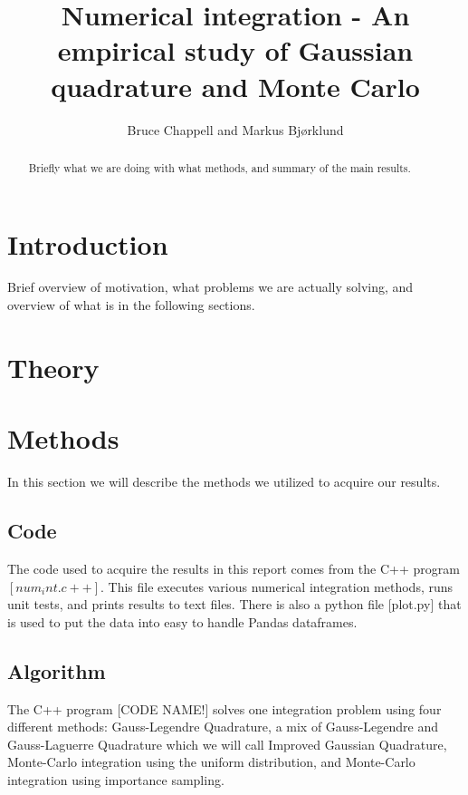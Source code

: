 \documentclass{emulateapj}
\begin{document}
\title{Numerical integration - An empirical study of Gaussian quadrature and Monte Carlo}

\author{Bruce Chappell and Markus Bjørklund}



\begin{abstract}

Briefly what we are doing with what methods, and summary of the main results.

\end{abstract}

\section{Introduction}
\label{sec:introduction}
Brief overview of motivation, what problems we are actually solving, and overview of what is in the following sections.


\section{Theory}
\label{sec:method}


\section{Methods}
\label{sec:methods}
In this section we will describe the methods we utilized to acquire our results.
\subsection{Code}
The code used to acquire the results in this report comes from the C++ program $[num_int.c++]$. This file executes various numerical integration methods, runs unit tests, and prints results to text files. There is also a python file [plot.py] that is used to put the data into easy to handle Pandas dataframes.

\subsection{Algorithm}
The C++ program [CODE NAME!] solves one integration problem using four different methods: Gauss-Legendre Quadrature, a mix of Gauss-Legendre and Gauss-Laguerre Quadrature which we will call Improved Gaussian Quadrature, Monte-Carlo integration using the uniform distribution, and Monte-Carlo integration using importance sampling.
\end{document}
